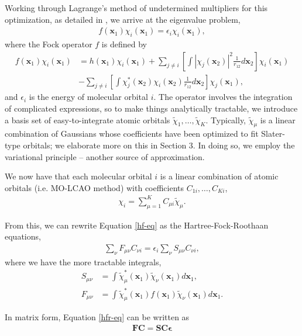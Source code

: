 \documentclass[12pt]{article}
\newcommand{\vect}[1]{\boldsymbol{#1}}
\begin{document}
Working through Lagrange's method of undetermined multipliers for this optimization, as detailed in \cite{sherrill2000introduction}, we arrive at the eigenvalue problem,
\begin{align}
f(\vect{x}_1)\chi_i (\vect{x}_1) = \epsilon_i \chi_i(\vect{x}_1) \label{hf-eq},
\end{align}
where the Fock operator $f$ is defined by 
\begin{align}
f(\vect{x}_1) \chi_i (\vect{x}_1) &= h(\vect{x}_1) \chi_i (\vect{x}_1) + \sum_{j \neq i} \left[ \int  | \chi_j(\vect{x}_2) |^2 \frac{1}{r_{12}} d \vect{x}_2 \right] \chi_i (\vect{x}_1) \nonumber \\
&- \sum_{j \neq i} \left[ \int  \chi_j^* (\vect{x}_2) \chi_i(\vect{x}_2) \frac{1}{r_{12}} d \vect{x}_2 \right] \chi_j (\vect{x}_1),
\end{align}
and $\epsilon_i$ is the energy of molecular orbital $i$.  The operator involves the integration of complicated expressions, so to make things analytically tractable, we introduce a basis set of easy-to-integrate atomic orbitals $\tilde{\chi}_1, \ldots, \tilde{\chi}_K$.  Typically, $\tilde{\chi}_\mu$ is a linear combination of Gaussians whose coefficients have been optimized to fit Slater-type orbitals; we elaborate more on this in Section 3.  In doing so, we employ the variational principle -- another source of approximation.  

We now have that each molecular orbital $i$ is a linear combination of atomic orbitals (i.e. MO-LCAO method) with coefficients $C_{1i}, \ldots, C_{Ki}$, 
\begin{align}
\chi_i = \sum_{\mu = 1}^K C_{\mu i} \tilde{\chi}_\mu. 
\end{align}    

From this, we can rewrite Equation \ref{hf-eq} as the Hartree-Fock-Roothaan equations, 
\begin{align}
\sum_{\nu} F_{\mu \nu} C_{\nu i} = \epsilon_i \sum_{\nu} S_{\mu \nu} C_{\nu i} \label{hfr-eq},
\end{align}
where we have the more tractable integrals, 
\begin{align}
S_{\mu \nu} &= \int \tilde{\chi}_\mu^*(\vect{x}_1) \tilde{\chi}_\nu(\vect{x}_1) d \vect{x}_1 \label{overlap}, \\
F_{\mu \nu} &= \int \tilde{\chi}_\mu^*(\vect{x}_1) f(\vect{x}_1) \tilde{\chi}_\nu(\vect{x}_1) d \vect{x}_1 \label{fock}.
\end{align}

In matrix form, Equation \ref{hfr-eq} can be written as 
\begin{align}
\vect{F} \vect{C} = \vect{S} \vect{C} \vect{\epsilon} \label{hfr}
\end{align}
\end{document}

